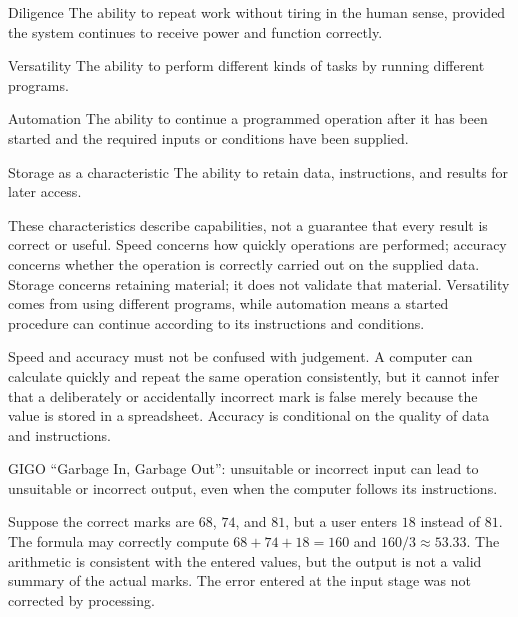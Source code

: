 \begin{definitionbox}{Diligence}
The ability to repeat work without tiring in the human sense, provided the
system continues to receive power and function correctly.
\end{definitionbox}

\begin{definitionbox}{Versatility}
The ability to perform different kinds of tasks by running different
programs.
\end{definitionbox}

\begin{definitionbox}{Automation}
The ability to continue a programmed operation after it has been started and
the required inputs or conditions have been supplied.
\end{definitionbox}

\begin{definitionbox}{Storage as a characteristic}
The ability to retain data, instructions, and results for later access.
\end{definitionbox}

These characteristics describe capabilities, not a guarantee that every
result is correct or useful. Speed concerns how quickly operations are
performed; accuracy concerns whether the operation is correctly carried out
on the supplied data. Storage concerns retaining material; it does not
validate that material. Versatility comes from using different programs,
while automation means a started procedure can continue according to its
instructions and conditions.

Speed and accuracy must not be confused with judgement. A computer can
calculate quickly and repeat the same operation consistently, but it cannot
infer that a deliberately or accidentally incorrect mark is false merely
because the value is stored in a spreadsheet. Accuracy is conditional on the
quality of data and instructions.

\begin{definitionbox}{GIGO}
``Garbage In, Garbage Out'': unsuitable or incorrect input can lead to
unsuitable or incorrect output, even when the computer follows its
instructions.
\end{definitionbox}

\begin{example}
Suppose the correct marks are $68$, $74$, and $81$, but a user enters $18$
instead of $81$. The formula may correctly compute
$68+74+18=160$ and $160/3\approx 53.33$. The arithmetic is consistent with
the entered values, but the output is not a valid summary of the actual
marks. The error entered at the input stage was not corrected by processing.
\end{example}


